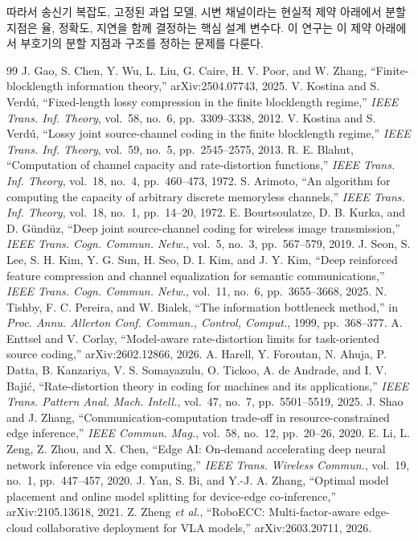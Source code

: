 \documentclass[11pt,a4paper]{article}
\begin{document}
따라서 송신기 복잡도, 고정된 과업 모델, 시변 채널이라는 현실적 제약 아래에서 분할 지점은 율, 정확도, 지연을 함께 결정하는 핵심 설계 변수다. 이 연구는 이 제약 아래에서 부호기의 분할 지점과 구조를 정하는 문제를 다룬다.

\begin{thebibliography}{99}\small
{} J. Gao, S. Chen, Y. Wu, L. Liu, G. Caire, H. V. Poor, and W. Zhang, ``Finite-blocklength information theory,'' arXiv:2504.07743, 2025.
 V. Kostina and S. Verdú, ``Fixed-length lossy compression in the finite blocklength regime,'' \emph{IEEE Trans. Inf. Theory}, vol.~58, no.~6, pp.~3309--3338, 2012.
 V. Kostina and S. Verdú, ``Lossy joint source-channel coding in the finite blocklength regime,'' \emph{IEEE Trans. Inf. Theory}, vol.~59, no.~5, pp.~2545--2575, 2013.
 R. E. Blahut, ``Computation of channel capacity and rate-distortion functions,'' \emph{IEEE Trans. Inf. Theory}, vol.~18, no.~4, pp.~460--473, 1972.
 S. Arimoto, ``An algorithm for computing the capacity of arbitrary discrete memoryless channels,'' \emph{IEEE Trans. Inf. Theory}, vol.~18, no.~1, pp.~14--20, 1972.
 E. Bourtsoulatze, D. B. Kurka, and D. Gündüz, ``Deep joint source-channel coding for wireless image transmission,'' \emph{IEEE Trans. Cogn. Commun. Netw.}, vol.~5, no.~3, pp.~567--579, 2019.
 J. Seon, S. Lee, S. H. Kim, Y. G. Sun, H. Seo, D. I. Kim, and J. Y. Kim, ``Deep reinforced feature compression and channel equalization for semantic communications,'' \emph{IEEE Trans. Cogn. Commun. Netw.}, vol.~11, no.~6, pp.~3655--3668, 2025.
 N. Tishby, F. C. Pereira, and W. Bialek, ``The information bottleneck method,'' in \emph{Proc. Annu. Allerton Conf. Commun., Control, Comput.}, 1999, pp.~368--377.
 A. Enttsel and V. Corlay, ``Model-aware rate-distortion limits for task-oriented source coding,'' arXiv:2602.12866, 2026.
 A. Harell, Y. Foroutan, N. Ahuja, P. Datta, B. Kanzariya, V. S. Somayazulu, O. Tickoo, A. de Andrade, and I. V. Bajić, ``Rate-distortion theory in coding for machines and its applications,'' \emph{IEEE Trans. Pattern Anal. Mach. Intell.}, vol.~47, no.~7, pp.~5501--5519, 2025.
 J. Shao and J. Zhang, ``Communication-computation trade-off in resource-constrained edge inference,'' \emph{IEEE Commun. Mag.}, vol.~58, no.~12, pp.~20--26, 2020.
 E. Li, L. Zeng, Z. Zhou, and X. Chen, ``Edge AI: On-demand accelerating deep neural network inference via edge computing,'' \emph{IEEE Trans. Wireless Commun.}, vol.~19, no.~1, pp.~447--457, 2020.
 J. Yan, S. Bi, and Y.-J. A. Zhang, ``Optimal model placement and online model splitting for device-edge co-inference,'' arXiv:2105.13618, 2021.
 Z. Zheng \emph{et al.}, ``RoboECC: Multi-factor-aware edge-cloud collaborative deployment for VLA models,'' arXiv:2603.20711, 2026.
\end{thebibliography}
\end{document}
